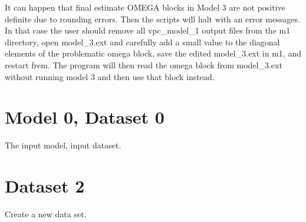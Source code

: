 It can happen that final estimate OMEGA blocks in Model 3 are not positive definite due to rounding errors. Then the scripts
will halt with an error messages. In that case the user should remove all vpc\_model\_1 output files from
the m1 directory, open model\_3.ext and carefully add a small value to the diagonal elements of the problematic omega block,
save the edited model\_3.ext in m1, and restart frem. The program will then read the omega block from model\_3.ext
without running model 3 and then use that block instead.

\section{Model 0, Dataset 0}
The input model, input dataset.

\section{Dataset 2}
Create a new data set.
